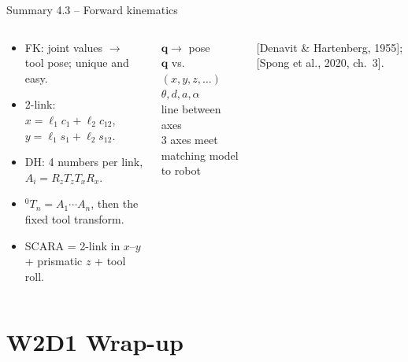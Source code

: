 \documentclass[aspectratio=169,10pt]{beamer}
\begin{document}
\begin{frame}[t]{Summary 4.3 -- Forward kinematics}
\begin{columns}[T,onlytextwidth]
\begin{keybox}
\small
\begin{itemize}
\item FK: joint values $\rightarrow$ tool pose; unique and easy.
\item 2-link: $x=\ell_1c_1+\ell_2c_{12}$, $y=\ell_1s_1+\ell_2s_{12}$.
\item DH: 4 numbers per link, $A_i=R_zT_zT_xR_x$.
\item ${}^0T_n=A_1\cdots A_n$, then the fixed tool transform.
\item SCARA = 2-link in $x$--$y$ + prismatic $z$ + tool roll.
\end{itemize}
\end{keybox}
\begin{defbox}
\small
{} $\bm q\rightarrow$ pose\\
 $\bm q$ vs.\ $(x,y,z,\ldots)$\\
 $\theta,d,a,\alpha$\\
 line between axes\\
 3 axes meet\\
 matching model to robot
\end{defbox}
{\scriptsize\color{mkGray} [Denavit \& Hartenberg, 1955]; [Spong et al., 2020, ch.~3].}
\end{columns}
\end{frame}

\section{W2D1 Wrap-up}
\end{document}
